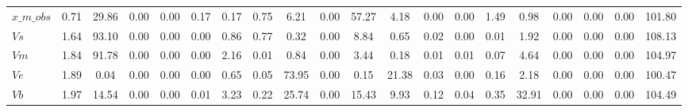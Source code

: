 \begin{center}
\begin{longtable}{lccccccccccccccccccc}
$x\_m\_obs                  $	 & 	                0.71	 & 	               29.86	 & 	                0.00	 & 	                0.00	 & 	                0.17	 & 	                0.17	 & 	                0.75	 & 	                6.21	 & 	                0.00	 & 	               57.27	 & 	                4.18	 & 	                0.00	 & 	                0.00	 & 	                1.49	 & 	                0.98	 & 	                0.00	 & 	                0.00	 & 	                0.00	 & 	              101.80 \\ 
$Vs                         $	 & 	                1.64	 & 	               93.10	 & 	                0.00	 & 	                0.00	 & 	                0.00	 & 	                0.86	 & 	                0.77	 & 	                0.32	 & 	                0.00	 & 	                8.84	 & 	                0.65	 & 	                0.02	 & 	                0.00	 & 	                0.01	 & 	                1.92	 & 	                0.00	 & 	                0.00	 & 	                0.00	 & 	              108.13 \\ 
$Vm                         $	 & 	                1.84	 & 	               91.78	 & 	                0.00	 & 	                0.00	 & 	                0.00	 & 	                2.16	 & 	                0.01	 & 	                0.84	 & 	                0.00	 & 	                3.44	 & 	                0.18	 & 	                0.01	 & 	                0.01	 & 	                0.07	 & 	                4.64	 & 	                0.00	 & 	                0.00	 & 	                0.00	 & 	              104.97 \\ 
$Ve                         $	 & 	                1.89	 & 	                0.04	 & 	                0.00	 & 	                0.00	 & 	                0.00	 & 	                0.65	 & 	                0.05	 & 	               73.95	 & 	                0.00	 & 	                0.15	 & 	               21.38	 & 	                0.03	 & 	                0.00	 & 	                0.16	 & 	                2.18	 & 	                0.00	 & 	                0.00	 & 	                0.00	 & 	              100.47 \\ 
$Vb                         $	 & 	                1.97	 & 	               14.54	 & 	                0.00	 & 	                0.00	 & 	                0.01	 & 	                3.23	 & 	                0.22	 & 	               25.74	 & 	                0.00	 & 	               15.43	 & 	                9.93	 & 	                0.12	 & 	                0.04	 & 	                0.35	 & 	               32.91	 & 	                0.00	 & 	                0.00	 & 	                0.00	 & 	              104.49 \\ 

\end{longtable}
\end{center}
